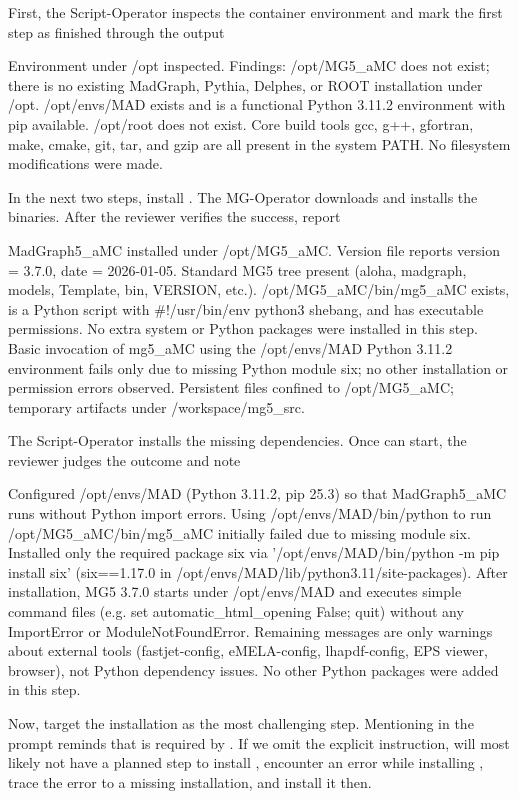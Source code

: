 \documentclass[submission, Phys]{SciPost}
\begin{document}
%
First, the Script-Operator inspects the container environment and \ma mark the first step as finished through the output
%
\begin{planblock}
Environment under /opt inspected. Findings: /opt/MG5\_aMC does not exist; there is no existing MadGraph, Pythia, Delphes, or ROOT installation under /opt. /opt/envs/MAD exists and is a functional Python 3.11.2 environment with pip available. /opt/root does not exist. Core build tools gcc, g++, gfortran, make, cmake, git, tar, and gzip are all present in the system PATH. No filesystem modifications were made.
\end{planblock}
%
In the next two steps, \ma install \mg. The MG-Operator downloads and installs the \mg binaries. After the reviewer verifies the success, \ma report
%
\begin{planblock}
MadGraph5\_aMC installed under /opt/MG5\_aMC. Version file reports version = 3.7.0, date = 2026-01-05. Standard MG5 tree present (aloha, madgraph, models, Template, bin, VERSION, etc.). /opt/MG5\_aMC/bin/mg5\_aMC exists, is a Python script with \#!/usr/bin/env python3 shebang, and has executable permissions. No extra system or Python packages were installed in this step. Basic invocation of mg5\_aMC using the /opt/envs/MAD Python 3.11.2 environment fails only due to missing Python module six; no other installation or permission errors observed. Persistent files confined to /opt/MG5\_aMC; temporary artifacts under /workspace/mg5\_src.
\end{planblock}
%
The Script-Operator installs the missing dependencies. Once \mg can start, the reviewer judges the outcome and \ma note
%
\begin{planblock}
Configured /opt/envs/MAD (Python 3.11.2, pip 25.3) so that MadGraph5\_aMC runs without Python import errors. Using /opt/envs/MAD/bin/python to run /opt/MG5\_aMC/bin/mg5\_aMC initially failed due to missing module six. Installed only the required package six via '/opt/envs/MAD/bin/python -m pip install six' (six==1.17.0 in /opt/envs/MAD/lib/python3.11/site-packages). After installation, MG5 3.7.0 starts under /opt/envs/MAD and executes simple command files (e.g. set automatic\_html\_opening False; quit) without any ImportError or ModuleNotFoundError. Remaining messages are only warnings about external tools (fastjet-config, eMELA-config, lhapdf-config, EPS viewer, browser), not Python dependency issues. No other Python packages were added in this step.
\end{planblock}
%
Now, \ma target the \root installation as the most challenging step. Mentioning \root in the prompt reminds \ma that \root is required by \delphes. If we omit the explicit \root instruction, \ma will most likely not have a planned step to install \root, encounter an error while installing \delphes, trace the error to a missing \root installation, and install it then. 
\end{document}
